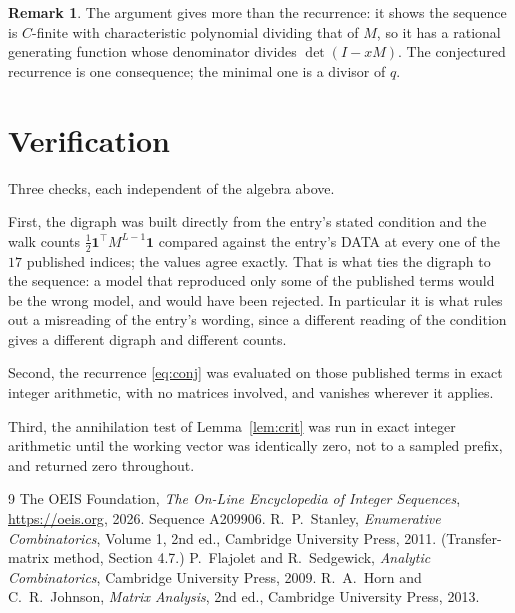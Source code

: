 \documentclass[11pt,a4paper]{article}
\theoremstyle{plain}
\theoremstyle{definition}
\newtheorem{remark}[theorem]{Remark}
\begin{document}
\begin{remark}
The argument gives more than the recurrence: it shows the sequence is $C$-finite with
characteristic polynomial dividing that of $M$, so it has a rational generating function
whose denominator divides $\det(I-xM)$. The conjectured recurrence is one consequence; the
minimal one is a divisor of $q$.
\end{remark}

\section{Verification}

Three checks, each independent of the algebra above.

First, the digraph was built directly from the entry's stated condition and the walk counts
$\tfrac1{2}\mathbf{1}^{\!\top}M^{L-1}\mathbf{1}$ compared against the entry's DATA at
every one of the $17$ published indices; the values agree exactly. That is what ties
the digraph to the sequence: a model that reproduced only some of the published terms would
be the wrong model, and would have been rejected. In particular it is what rules out a
misreading of the entry's wording, since a different reading of the condition gives a
different digraph and different counts.

Second, the recurrence \eqref{eq:conj} was evaluated on those published terms in exact
integer arithmetic, with no matrices involved, and vanishes wherever it applies.

Third, the annihilation test of Lemma~\ref{lem:crit} was run in exact integer arithmetic
until the working vector was identically zero, not to a sampled prefix, and returned zero
throughout.

\begin{thebibliography}{9}
 The OEIS Foundation, \emph{The On-Line Encyclopedia of Integer
Sequences}, \url{https://oeis.org}, 2026. Sequence A209906.
 R.~P.~Stanley, \emph{Enumerative Combinatorics}, Volume 1, 2nd ed.,
Cambridge University Press, 2011. (Transfer-matrix method, Section 4.7.)
 P.~Flajolet and R.~Sedgewick, \emph{Analytic Combinatorics}, Cambridge
University Press, 2009.
 R.~A.~Horn and C.~R.~Johnson, \emph{Matrix Analysis}, 2nd ed., Cambridge
University Press, 2013.
\end{thebibliography}
\end{document}
